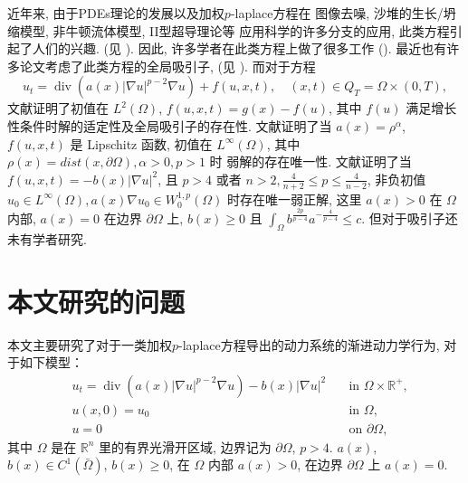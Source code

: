 \documentclass[oneside,longtitle]{LZUthesis}
\theoremstyle{definition}
\numberwithin{equation}{chapter}
\newcommand*\abs[1]{\lvert#1\rvert}
\newcommand\R{\mathbb{R}}
\DeclareMathOperator{\Div}{div}
\begin{document}
近年来, 由于PDEs理论的发展以及加权$p$-laplace方程在
图像去噪, 沙堆的生长/坍缩模型, 非牛顿流体模型, II型超导理论等
应用科学的许多分支的应用, 此类方程引起了人们的兴趣.
(见 \citep{aronssonFastSlowDiffusion1996,aubertMathematicalProblemsImage2006,mastorakisSolutionPLaplacianNonNewtonian2009,yinLaplacianTypeEvolution2001}).
因此, 许多学者在此类方程上做了很多工作
(\citep{cortazarExistenceSignChanging2014,musinaExistenceMultiplicityResults2009,gazziniSobolevtypeInequalityRelated2009,liLongtimeBehaviorClass2014b,maGlobalAttractorsWeighted2012a,cavalheiroWeightedSobolevSpaces2008,caldiroliVariationalDegenerateElliptic2000,leBoundaryValueProblems1998,monticelliMaximumPrinciplesWeak2009,dibenedettoDegenerateSingularParabolic1993,galClassDegenerateParabolic2012,yinEvolutionaryWeightedPLaplacian2007,Zhan2019Uniquenessa}).
最近也有许多论文考虑了此类方程的全局吸引子,
(见 \citep{anhGlobalExistenceLongtime2008,anhGlobalAttractorMsemiflow2010,anhLongtimeBehaviorQuasilinear2009,karachaliosConvergenceAttractorsDegenerate2005,karachaliosDynamicsDegenerateParabolic2006,karachaliosGlobalAttractorsConvergence2005}).
而对于方程
\begin{equation}
	u_t = \Div(a(x)\abs{\nabla u}^{p-2}\nabla u) + f(u, x, t), \quad (x, t) \in Q_T = \Omega \times (0, T),
\end{equation}
文献\citep{maGlobalAttractorsWeighted2012a}证明了初值在 $L^2(\Omega)$, $f(u, x, t) = g(x) - f(u)$, 其中 $f(u)$ 满足增长性条件时解的适定性及全局吸引子的存在性.
文献\citep{zhanParabolicEquationRelated2016}证明了当
$a(x) = \rho^\alpha$, $f(u, x, t)$ 是 Lipschitz 函数, 初值在 $L^\infty(\Omega)$, 其中 $\rho(x) = dist(x, \partial \Omega), \alpha > 0, p > 1$ 时
弱解的存在唯一性. 文献\citep{Zhan2019Uniquenessa}证明了当 $f(u, x, t) = -b(x)\abs{\nabla u}^2$,
且 $p > 4$ 或者 $n > 2, \frac{4}{n+2} \leq p \leq \frac{4}{n-2}$,
非负初值 $u_0 \in L^\infty(\Omega), a(x)\nabla u_0 \in W_0^{1, p}(\Omega)$ 时存在唯一弱正解,
这里 $a(x) > 0$ 在 $\Omega$ 内部, $a(x) = 0$ 在边界 $\partial\Omega$ 上,
$b(x) \geq 0$ 且 $\int_{\Omega} b^{\frac{2p}{p-4}}a^{-\frac{4}{p-4}} \leq c$.
但对于吸引子还未有学者研究.

\section{本文研究的问题}
本文主要研究了对于一类加权$p$-laplace方程导出的动力系统的渐进动力学行为,
对于如下模型：
\begin{equation}\label{eq:main}
	\begin{alignedat}{2}
		& u_t = \Div(a(x)\abs{\nabla u}^{p-2}\nabla u) - b(x)\abs{\nabla u}^2 \quad &\text{in } \Omega \times \R^+,\\
		& u(x,0) = u_0 \quad &\text{in } \Omega,\\
		& u = 0 \quad &\text{on } \partial\Omega,
	\end{alignedat}
\end{equation}
其中 $\Omega$ 是在 $\R^{n}$ 里的有界光滑开区域, 边界记为 $\partial\Omega$, $p>4$.
$ a(x)$, $b(x) \in C^1(\bar{\Omega}) $, $b(x) \geq 0$, 在 $\Omega$ 内部 $a(x) > 0$, 在边界 $\partial\Omega$ 上 $a(x) = 0$.
\end{document}
